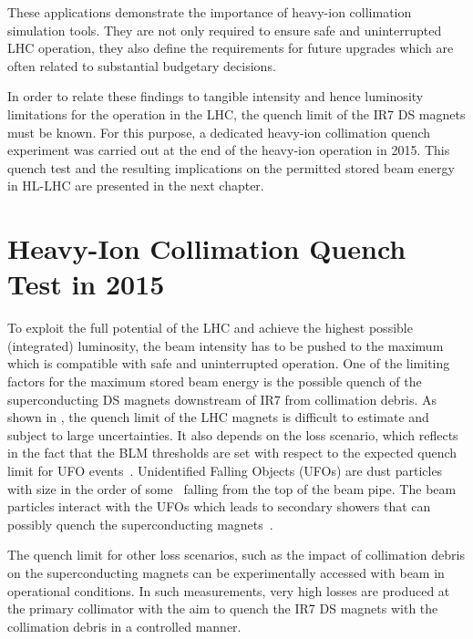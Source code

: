 These applications demonstrate the importance of heavy-ion collimation simulation tools. They are not only required to ensure safe and uninterrupted LHC operation, they also define the requirements for future upgrades which are often related to substantial budgetary decisions. 



In order to relate these findings to tangible intensity and hence luminosity limitations for the operation in the LHC, the quench limit of the IR7 DS magnets must be known. For this purpose, a dedicated heavy-ion collimation quench experiment was carried out at the end of the heavy-ion operation in 2015. This quench test and the resulting implications on the permitted stored beam energy in HL-LHC are presented in the next chapter. 


















\chapter{Heavy-Ion Collimation Quench Test in 2015}  \label{chapter:quenchtest}

To exploit the full potential of the LHC and achieve the highest possible (integrated) luminosity, the beam intensity has to be pushed to the maximum which is compatible with safe and uninterrupted operation. One of the limiting factors for the maximum stored beam energy is the possible quench of the superconducting DS magnets downstream of IR7 from collimation debris. As shown in , the quench limit of the LHC magnets is difficult to estimate and subject to large uncertainties. It also depends on the loss scenario, which reflects in the fact that the BLM thresholds are set with respect to the expected quench limit for UFO events~\cite{IPAC2011:TUPC137}. Unidentified Falling Objects (UFOs) are dust particles with size in the order of some \mum\, falling from the top of the beam pipe. The beam particles interact with the UFOs which leads to secondary showers that can possibly quench the superconducting magnets~\cite{IPAC2011:TUPC137}. 

The quench limit for other loss scenarios, such as the impact of collimation debris on the superconducting magnets can be experimentally accessed with beam in operational conditions. In such measurements, very high losses are produced at the primary collimator with the aim to quench the IR7 DS magnets with the collimation debris in a controlled manner. 

